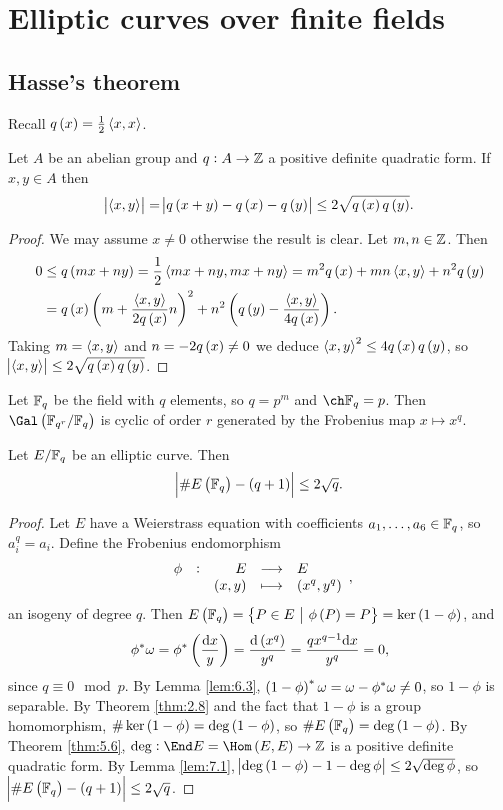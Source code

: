 \pagebreak

\section{Elliptic curves over finite fields}

\subsection{Hasse's theorem}

Recall $ q\br{x} = \tfrac{1}{2}\abr{x, x} $.

\begin{lemma}
\label{lem:7.1}
Let $ A $ be an abelian group and $ q : A \to \mathbb{Z} $ a positive definite quadratic form. If $ x, y \in A $ then
$$ \abs{\abr{x, y}} = \abs{q\br{x + y} - q\br{x} - q\br{y}} \le 2\sqrt{q\br{x}q\br{y}}. $$
\end{lemma}

\begin{proof}
We may assume $ x \ne 0 $ otherwise the result is clear. Let $ m, n \in \mathbb{Z} $. Then
\begin{align*}
0
& \le q\br{mx + ny}
= \dfrac{1}{2}\abr{mx + ny, mx + ny}
= m^2q\br{x} + mn\abr{x, y} + n^2q\br{y} \\
& = q\br{x}\br{m + \dfrac{\abr{x, y}}{2q\br{x}}n}^2 + n^2\br{q\br{y} - \dfrac{\abr{x, y}}{4q\br{x}}}.
\end{align*}
Taking $ m = \left\langle x, y \right\rangle $ and $ n = -2q\br{x} \ne 0 $ we deduce $ \abr{x, y}^2 \le 4q\br{x}q\br{y} $, so $ \abs{\abr{x, y}} \le 2\sqrt{q\br{x}q\br{y}} $.
\end{proof}

Let $ \mathbb{F}_q $ be the field with $ q $ elements, so $ q = p^m $ and $ \ch \FF_q = p $. Then $ \Gal\br{\FF_{q^r} / \FF_q} $ is cyclic of order $ r $ generated by the Frobenius map $ x \mapsto x^q $.

\begin{theorem}[Hasse]
Let $ E / \mathbb{F}_q $ be an elliptic curve. Then
$$ \abs{\#E\br{\FF_q} - \br{q + 1}} \le 2\sqrt{q}. $$
\end{theorem}

\begin{proof}
Let $ E $ have a Weierstrass equation with coefficients $ a_1, \dots, a_6 \in \mathbb{F}_q $, so $ a_i^q = a_i $. Define the Frobenius endomorphism
$$ \function[\phi]{E}{E}{\br{x, y}}{\br{x^q, y^q}}, $$
an isogeny of degree $ q $. Then $ E\br{\FF_q} = \cbr{P \in E \st \phi\br{P} = P} = \ker \br{1 - \phi} $, and
$$ \phi^*\omega = \phi^*\br{\dfrac{\d x}{y}} = \dfrac{\d\br{x^q}}{y^q} = \dfrac{qx^{q - 1}\d x}{y^q} = 0, $$
since $ q \equiv 0 \mod p $. By Lemma \ref{lem:6.3}, $ \br{1 - \phi}^*\omega = \omega - \phi^*\omega \ne 0 $, so $ 1 - \phi $ is separable. By Theorem \ref{thm:2.8} and the fact that $ 1 - \phi $ is a group homomorphism, $ \#\ker \br{1 - \phi} = \deg \br{1 - \phi} $, so $ \#E\br{\FF_q} = \deg \br{1 - \phi} $. By Theorem \ref{thm:5.6}, $ \deg : \End E = \Hom\br{E, E} \to \ZZ $ is a positive definite quadratic form. By Lemma \ref{lem:7.1}, $ \abs{\deg \br{1 - \phi} - 1 - \deg \phi} \le 2\sqrt{\deg \phi} $, so $ \abs{\#E\br{\FF_q} - \br{q + 1}} \le 2\sqrt{q} $.
\end{proof}

